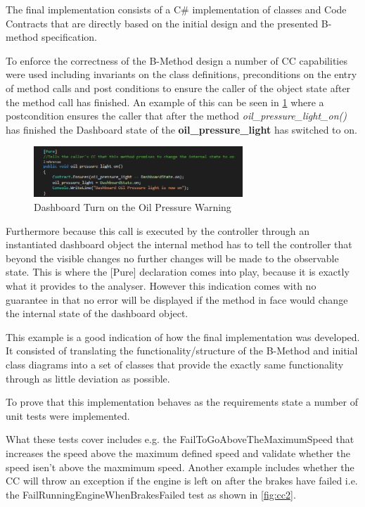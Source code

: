 \documentclass[12pt]{article}
\begin{document}
The final implementation consists of a C\# implementation of classes and Code Contracts that are directly based on the initial design and the presented B-method specification.


To enforce the correctness of the B-Method design a  number of CC capabilities were used including invariants on the class definitions, preconditions on the entry of method calls and post conditions to ensure the caller of the object state after the method call has finished. An example of this can be seen in \ref{fig:cc1} where a postcondition ensures the caller that after the method \textit{oil\_pressure\_light\_on()} has finished the Dashboard state of the \textbf{oil\_pressure\_light} has switched to on.
\begin{figure}[H]
	\centering
	\includegraphics[width=0.7\textwidth]{cc_ensures_dashbord}
	\caption{Dashboard Turn on the Oil Pressure Warning}
	\label{fig:cc1}
\end{figure}

Furthermore because this call is executed by the controller through an instantiated dashboard object the internal method has to tell the controller that beyond the visible changes no further changes will be made to the observable state. This is where the [Pure] declaration comes into play, because it is exactly what it provides to the analyser. However this indication comes with no guarantee in that no error will be displayed if the method in face would change the internal state of the dashboard object.

This example is a good indication of how the final implementation was developed. It consisted of translating the functionality/structure of the B-Method and initial class diagrams into a set of classes that provide the exactly same functionality through as little deviation as possible.

To prove that this implementation behaves as the requirements state a number of unit tests were implemented. 

What these tests cover includes e.g. the FailToGoAboveTheMaximumSpeed that increases the speed above the maximum defined speed and validate whether the speed isen't above the maxmimum speed. Another example includes whether the CC will throw an exception if the engine is left on after the brakes have failed i.e. the FailRunningEngineWhenBrakesFailed test as shown in \ref{fig:cc2}.
\end{document}
